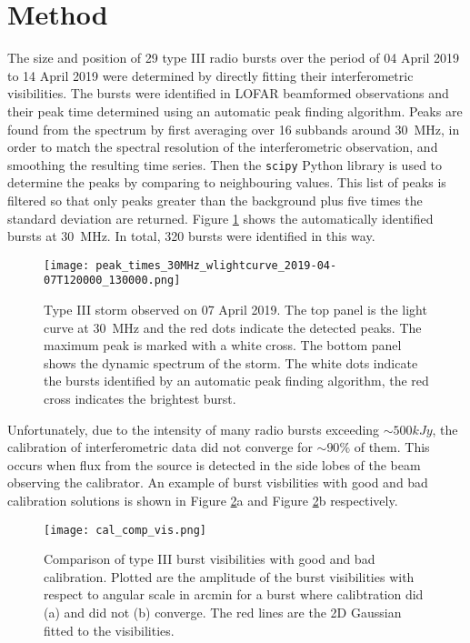 \section{Method}
\label{sec:obsvtheory_method}
The size and position of 29 type III radio bursts over the period of 04 April 2019 to 14 April 2019 were determined by directly fitting their interferometric visibilities. The bursts were identified in LOFAR beamformed observations and their peak time determined using an automatic peak finding algorithm. Peaks are found from the spectrum by first averaging over 16 subbands around 30~MHz, in order to match the spectral resolution of the interferometric observation, and smoothing the resulting time series. Then the \texttt{scipy} Python library \citep{Virtanen2020} is used to determine the peaks by comparing to neighbouring values. This list of peaks is filtered so that only peaks greater than the background plus five times the standard deviation are returned.
Figure \ref{fig:dynamic_spectrum_070419} shows the automatically identified bursts at 30~MHz. In total, 320 bursts were identified in this way. 

\begin{figure}
\centering
\texttt{[image: peak\_times\_30MHz\_wlightcurve\_2019-04-07T120000\_130000.png]}
\caption[Type III storm observed on 07 April 2019.]{Type III storm observed on 07 April 2019. The top panel is the light curve at 30~MHz and the red dots indicate the detected peaks. The maximum peak is marked with a white cross. The bottom panel shows the dynamic spectrum of the storm. The white dots indicate the bursts identified by an automatic peak finding algorithm, the red cross indicates the brightest burst.}
\label{fig:dynamic_spectrum_070419}
\end{figure}

Unfortunately, due to the intensity of many radio bursts exceeding $\sim 500 kJy$, the calibration of interferometric data did not converge for $\sim 90 \%$ of them. This occurs when flux from the source is detected in the side lobes of the beam observing the calibrator. An example of burst visbilities with good and bad calibration solutions is shown in Figure \ref{fig:cal_comp}a and Figure \ref{fig:cal_comp}b respectively. 

\begin{figure}
\centering
\texttt{[image: cal\_comp\_vis.png]}
\caption[Comparison of type III burst visibilities with good and bad calibration.]{Comparison of type III burst visibilities with good and bad calibration. Plotted are the amplitude of the burst visibilities with respect to angular scale in arcmin for a burst where calibtration did (a) and did not (b) converge. The red lines are the 2D Gaussian fitted to the visibilities.}
\label{fig:cal_comp}
\end{figure}

